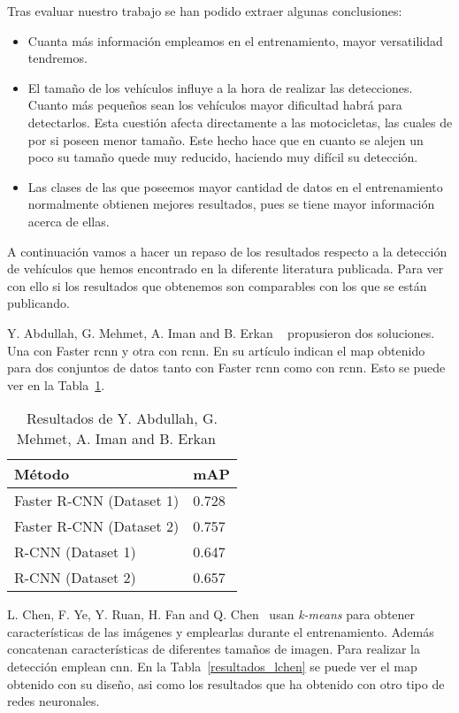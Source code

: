 Tras evaluar nuestro trabajo se han podido extraer algunas conclusiones:
\begin{itemize}
    \item Cuanta más información empleamos en el entrenamiento, mayor versatilidad tendremos.
    \item El tamaño de los vehículos influye a la hora de realizar las detecciones. Cuanto más pequeños sean los vehículos mayor dificultad habrá para detectarlos. Esta cuestión afecta directamente a las motocicletas, las cuales de por si poseen menor tamaño. Este hecho hace que en cuanto se alejen un poco su tamaño quede muy reducido, haciendo muy difícil su detección.
    \item Las clases de las que poseemos mayor cantidad de datos en el entrenamiento normalmente obtienen mejores resultados, pues se tiene mayor información acerca de ellas.
\end{itemize}

A continuación vamos a hacer un repaso de los resultados respecto a la detección de vehículos que hemos encontrado en la diferente literatura publicada. Para ver con ello si los resultados que obtenemos son comparables con los que se están publicando.

Y. Abdullah, G. Mehmet, A. Iman and B. Erkan ~\cite{rcnn_detection} propusieron dos soluciones. Una con Faster \acrshort{rcnn} y otra con \acrshort{rcnn}. En su artículo indican el \acrshort{map} obtenido para dos conjuntos de datos tanto con Faster \acrshort{rcnn} como con \acrshort{rcnn}. Esto se puede ver en la Tabla~\ref{resultados_abdullah}.

\begin{table}[H] 
\begin{center}
\begin{tabular}{|l|l|}
\hline
Método & mAP  \\ 
\hline \hline
Faster R-CNN (Dataset 1) & 0.728  \\ \hline
Faster R-CNN (Dataset 2)  & 0.757 \\ \hline
R-CNN (Dataset 1) & 0.647  \\ \hline
R-CNN (Dataset 2)  & 0.657 \\ \hline
\end{tabular}
\caption{Resultados de Y. Abdullah, G. Mehmet, A. Iman and B. Erkan ~\cite{rcnn_detection}}
\label{resultados_abdullah}
\end{center}
\end{table}

L. Chen, F. Ye, Y. Ruan, H. Fan and Q. Chen~\cite{l_chen} usan \textit{k-means} para obtener características de las imágenes y emplearlas durante el entrenamiento. Además concatenan características de diferentes tamaños de imagen. Para realizar la detección emplean \acrshort{cnn}. En la Tabla~\ref{resultados_lchen} se puede ver el \acrshort{map} obtenido con su diseño, asi como los resultados que ha obtenido con otro tipo de redes neuronales.

